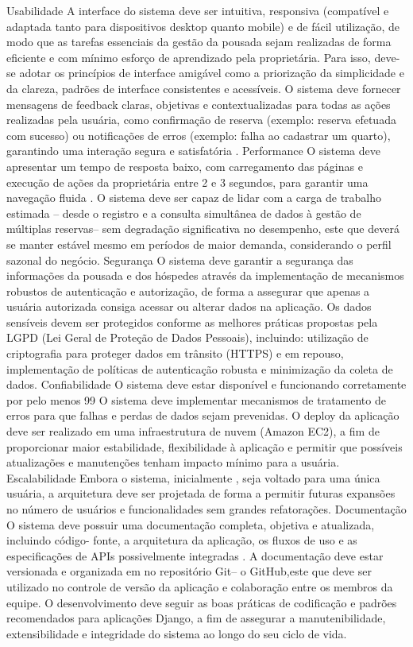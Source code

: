Usabilidade
A interface do sistema deve ser intuitiva, responsiva (compatível e adaptada tanto para dispositivos desktop quanto mobile)  e de fácil utilização, de modo que as tarefas essenciais da gestão da pousada sejam realizadas de forma eficiente e com mínimo esforço de aprendizado pela proprietária.  Para isso, deve-se adotar os princípios de interface amigável como a priorização da simplicidade e da clareza, padrões de interface consistentes e acessíveis.
O sistema deve fornecer mensagens de feedback claras, objetivas e contextualizadas para  todas as ações  realizadas pela usuária, como confirmação de reserva (exemplo: reserva efetuada com sucesso) ou notificações de erros (exemplo: falha ao cadastrar um quarto), garantindo uma interação segura e  satisfatória .
Performance
O sistema deve apresentar um tempo de resposta baixo, com carregamento das páginas e execução de ações da proprietária entre 2 e 3 segundos, para garantir uma navegação fluida .
O sistema deve ser capaz de lidar com a carga de trabalho estimada – desde o registro e a consulta simultânea de dados à gestão de múltiplas reservas– sem degradação significativa no desempenho, este que deverá se manter estável mesmo em períodos de maior demanda, considerando o perfil sazonal do negócio. 
Segurança
O sistema deve garantir a segurança das informações da pousada e dos hóspedes através da implementação de mecanismos robustos de autenticação e autorização, de forma a assegurar que apenas a usuária autorizada consiga acessar ou alterar dados na aplicação.
Os dados sensíveis devem ser protegidos conforme as melhores práticas propostas pela LGPD (Lei Geral de Proteção de Dados Pessoais), incluindo: utilização de criptografia para proteger dados em trânsito (HTTPS) e em repouso, implementação de políticas de autenticação robusta e minimização da coleta de dados.
Confiabilidade
O sistema deve estar disponível e funcionando corretamente por pelo menos  99%
O sistema deve implementar mecanismos de tratamento de erros para que falhas e perdas de dados sejam prevenidas.  
O deploy da aplicação deve ser realizado em uma infraestrutura de nuvem (Amazon EC2),  a fim de proporcionar maior estabilidade, flexibilidade à aplicação e permitir que possíveis atualizações e manutenções tenham impacto mínimo para a usuária.
Escalabilidade
Embora o sistema, inicialmente , seja voltado para uma única usuária, a arquitetura deve ser projetada de forma a permitir futuras expansões no número de usuários e funcionalidades sem grandes refatorações.
Documentação
O sistema deve possuir uma documentação completa, objetiva e atualizada, incluindo código- fonte, a arquitetura da aplicação, os fluxos de uso e as especificações de APIs possivelmente integradas . 
A documentação deve estar versionada e organizada em no repositório Git– o GitHub,este que deve ser utilizado no controle de versão da aplicação  e colaboração entre os membros da equipe. 
O desenvolvimento deve seguir as boas práticas de codificação e padrões recomendados para aplicações Django, a fim de assegurar a manutenibilidade, extensibilidade e integridade do sistema ao longo do seu ciclo de vida.


